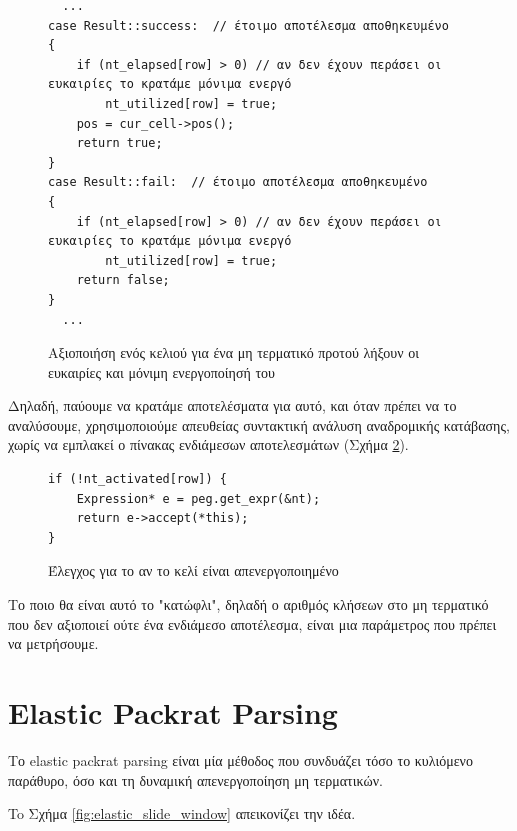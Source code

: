 \begin{figure}[h]
\setlength\partopsep{-\topsep}%
\begin{verbatim}
  ...
case Result::success:  // έτοιμο αποτέλεσμα αποθηκευμένο 
{
    if (nt_elapsed[row] > 0) // αν δεν έχουν περάσει οι ευκαιρίες το κρατάμε μόνιμα ενεργό
        nt_utilized[row] = true;
    pos = cur_cell->pos();
    return true;
}
case Result::fail:  // έτοιμο αποτέλεσμα αποθηκευμένο 
{
    if (nt_elapsed[row] > 0) // αν δεν έχουν περάσει οι ευκαιρίες το κρατάμε μόνιμα ενεργό
        nt_utilized[row] = true;
    return false;
}
  ...
\end{verbatim}
  \caption{Aξιοποιήση ενός κελιού για ένα μη τερματικό προτού λήξουν οι ευκαιρίες και μόνιμη ενεργοποίησή του}
\label{fig:elastic_keep_active}
\end{figure}


Δηλαδή, παύουμε να κρατάμε αποτελέσματα για αυτό, και όταν πρέπει να το αναλύσουμε, χρησιμοποιούμε απευθείας συντακτική ανάλυση αναδρομικής κατάβασης, χωρίς να εμπλακεί ο πίνακας ενδιάμεσων αποτελεσμάτων (Σχήμα \ref{fig:elastic_deactivated}).

\begin{figure}[h]
\setlength\partopsep{-\topsep}%
\begin{verbatim}
if (!nt_activated[row]) {
    Expression* e = peg.get_expr(&nt);
    return e->accept(*this);
}
\end{verbatim}
  \caption{Έλεγχος για το αν το κελί είναι απενεργοποιημένο}
\label{fig:elastic_deactivated}
\end{figure}

Το ποιο θα είναι αυτό το "κατώφλι", δηλαδή ο αριθμός κλήσεων στο μη τερματικό που δεν αξιοποιεί ούτε ένα ενδιάμεσο αποτέλεσμα, είναι μια παράμετρος που πρέπει να μετρήσουμε.

\section{Elastic Packrat Parsing}

Το elastic packrat parsing είναι μία μέθοδος που συνδυάζει τόσο το κυλιόμενο παράθυρο, όσο και τη δυναμική απενεργοποίηση μη τερματικών.

To Σχήμα \ref{fig:elastic_slide_window} απεικονίζει την ιδέα.

